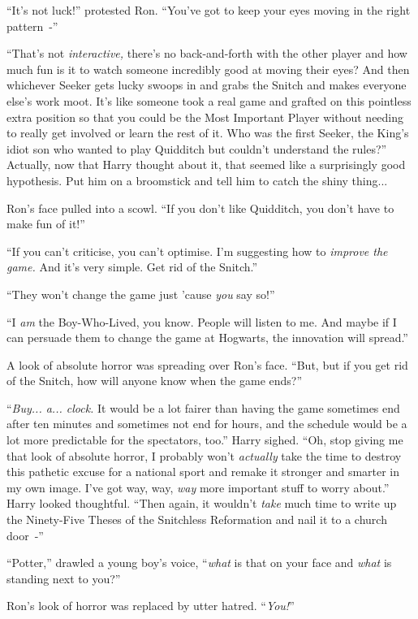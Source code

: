 ``It's not luck!'' protested Ron. ``You've got to keep your eyes moving in the right pattern~-''

``That's not \emph{interactive,} there's no back-and-forth with the other player and how much fun is it to watch someone incredibly good at moving their eyes? And then whichever Seeker gets lucky swoops in and grabs the Snitch and makes everyone else's work moot. It's like someone took a real game and grafted on this pointless extra position so that you could be the Most Important Player without needing to really get involved or learn the rest of it. Who was the first Seeker, the King's idiot son who wanted to play Quidditch but couldn't understand the rules?'' Actually, now that Harry thought about it, that seemed like a surprisingly good hypothesis. Put him on a broomstick and tell him to catch the shiny thing...

Ron's face pulled into a scowl. ``If you don't like Quidditch, you don't have to make fun of it!''

``If you can't criticise, you can't optimise. I'm suggesting how to \emph{improve the game.} And it's very simple. Get rid of the Snitch.''

``They won't change the game just 'cause \emph{you} say so!''

``I \emph{am} the Boy-Who-Lived, you know. People will listen to me. And maybe if I can persuade them to change the game at Hogwarts, the innovation will spread.''

A look of absolute horror was spreading over Ron's face. ``But, but if you get rid of the Snitch, how will anyone know when the game ends?''

``\emph{Buy... a... clock.} It would be a lot fairer than having the game sometimes end after ten minutes and sometimes not end for hours, and the schedule would be a lot more predictable for the spectators, too.'' Harry sighed. ``Oh, stop giving me that look of absolute horror, I probably won't \emph{actually} take the time to destroy this pathetic excuse for a national sport and remake it stronger and smarter in my own image. I've got way, way, \emph{way} more important stuff to worry about.'' Harry looked thoughtful. ``Then again, it wouldn't \emph{take} much time to write up the Ninety-Five Theses of the Snitchless Reformation and nail it to a church door~-''

``Potter,'' drawled a young boy's voice, ``\emph{what} is that on your face and \emph{what} is standing next to you?''

Ron's look of horror was replaced by utter hatred. ``\emph{You!}''

